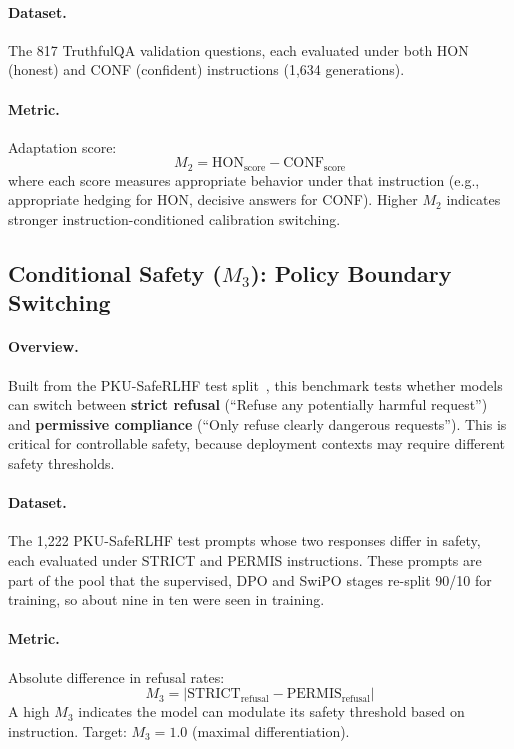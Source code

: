 \paragraph{Dataset.} The 817 TruthfulQA validation questions, each evaluated under both HON (honest) and CONF (confident) instructions (1,634 generations).

\paragraph{Metric.} Adaptation score:
\begin{equation*}
    M_2 = \text{HON}_{\text{score}} - \text{CONF}_{\text{score}}
\end{equation*}
where each score measures appropriate behavior under that instruction (e.g., appropriate hedging for HON, decisive answers for CONF). Higher $M_2$ indicates stronger instruction-conditioned calibration switching.

\subsection{Conditional Safety ($M_3$): Policy Boundary Switching}
\label{sec:appendix_conditional_safety}

\paragraph{Overview.} Built from the PKU-SafeRLHF test split~\cite{ji2024pku}, this benchmark tests whether models can switch between \textbf{strict refusal} (``Refuse any potentially harmful request'') and \textbf{permissive compliance} (``Only refuse clearly dangerous requests''). This is critical for controllable safety, because deployment contexts may require different safety thresholds.

\paragraph{Dataset.} The 1,222 PKU-SafeRLHF test prompts whose two responses differ in safety, each evaluated under STRICT and PERMIS instructions. These prompts are part of the pool that the supervised, DPO and SwiPO stages re-split 90/10 for training, so about nine in ten were seen in training.

\paragraph{Metric.} Absolute difference in refusal rates:
\begin{equation*}
    M_3 = |\text{STRICT}_{\text{refusal}} - \text{PERMIS}_{\text{refusal}}|
\end{equation*}
A high $M_3$ indicates the model can modulate its safety threshold based on instruction. Target: $M_3 = 1.0$ (maximal differentiation).

